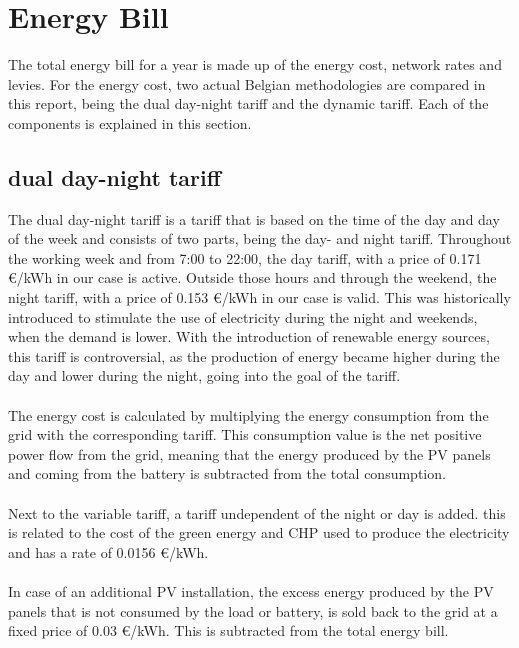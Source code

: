 
\section{Energy Bill}
\label{sec:energy-bill}
The total energy bill for a year is made up of the energy cost, network rates and levies. For the energy cost, two actual Belgian methodologies are compared in this report, being the dual day-night tariff and the dynamic tariff. Each of the components is explained in this section. 

\subsection{dual day-night tariff}
\label{sec:dual-day-night}
The dual day-night tariff is a tariff that is based on the time of the day and day of the week and consists of two parts, being the day- and night tariff. Throughout the working week and from 7:00 to 22:00, the day tariff, with a price of 0.171 \euro/kWh in our case is active. Outside those hours and through the weekend, the night tariff, with a price of 0.153 \euro/kWh in our case is valid. This was historically introduced to stimulate the use of electricity during the night and weekends, when the demand is lower. With the introduction of renewable energy sources, this tariff is controversial, as the production of energy became higher during the day and lower during the night, going into the goal of the tariff.
\\ \\
The energy cost is calculated by multiplying the energy consumption from the grid with the corresponding tariff. This consumption value is the net positive power flow from the grid, meaning that the energy produced by the PV panels and coming from the battery is subtracted from the total consumption.
\\ \\
Next to the variable tariff, a tariff undependent of the night or day is added. this is related to the cost of the green energy and CHP used to produce the electricity and has a rate of 0.0156 \euro/kWh.
\\ \\
In case of an additional PV installation, the excess energy produced by the PV panels that is not consumed by the load or battery, is sold back to the grid at a fixed price of 0.03 \euro/kWh. This is subtracted from the total energy bill.


